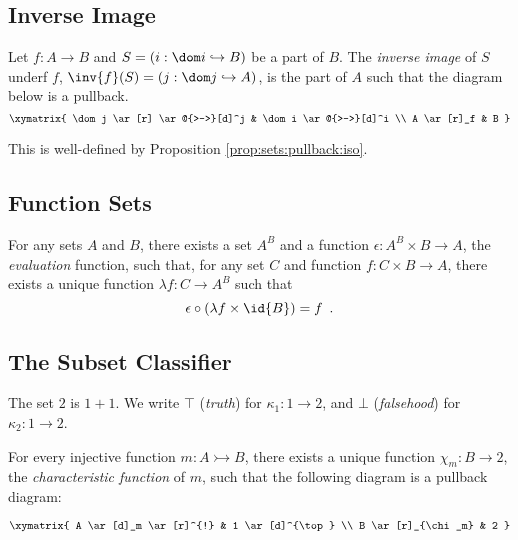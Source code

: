 \subsection{Inverse Image}

\begin{df}
  Let $f : A \rightarrow B$ and $S = (i : \dom i \hookrightarrow B)$ be a part of $B$.
  The \emph{inverse image} of $S$ underf $f$, $\inv{f}(S) = (j : \dom j \hookrightarrow A)$, is the part of $A$
  such that the diagram below is a pullback.
  \[ \xymatrix{
  \dom j \ar[r] \ar@{>->}[d]^j & \dom i \ar@{>->}[d]^i \\
  A \ar[r]_f & B
  } \]

  This is well-defined by Proposition \ref{prop:sets:pullback:iso}.
\end{df}

\subsection{Function Sets}

\begin{ax}
  For any sets $A$ and $B$, there exists a set $A^B$ and a function $\epsilon
  : A^B \times B \rightarrow A$, the \emph{evaluation} function, such that,
  for any set $C$ and function $f : C \times B \rightarrow A$, there exists a
  unique function $\lambda f : C \rightarrow A^B$ such that
  \[ \epsilon \circ (\lambda f \times \id{B}) = f \enspace . \]
\end{ax}

\subsection{The Subset Classifier}

\begin{df}
  The set $2$ is $1 + 1$. We write $\top$ (\emph{truth}) for $\kappa_1 : 1
  \rightarrow 2$, and $\bot$ (\emph{falsehood}) for $\kappa_2 : 1 \rightarrow
  2$.
\end{df}

\begin{ax}
  For every injective function $m : A \rightarrowtail B$, there exists a
  unique function $\chi_m : B \rightarrow 2$, the \emph{characteristic
    function} of $m$, such that the following diagram is a pullback diagram:

  \[
  \xymatrix{
    A \ar[d]_m \ar[r]^{!} & 1 \ar[d]^{\top} \\
    B \ar[r]_{\chi_m} & 2
  }
  \]
\end{ax}

